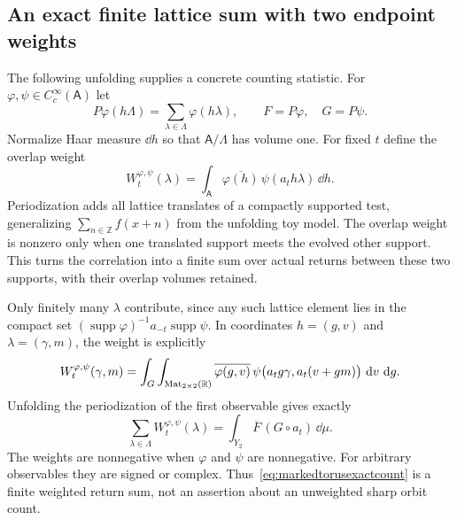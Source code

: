 \subsection{An exact finite lattice sum with two endpoint weights}

The following unfolding supplies a concrete counting statistic.
For $\varphi,\psi\in C_c^\infty(\mathsf A)$ let
\[
 P\varphi(h\Lambda)=\sum_{\lambda\in\Lambda}\varphi(h\lambda),
 \qquad F=P\varphi,\quad G=P\psi.
\]
Normalize Haar measure $\dd h$ so that $\mathsf A/\Lambda$ has volume one.
For fixed $t$ define the overlap weight
\begin{equation}
 W_t^{\varphi,\psi}(\lambda)
 =\int_{\mathsf A}\overline{\varphi(h)}\,
                   \psi(a_th\lambda)\,\dd h.
 \label{eq:markedtorusweight}
\end{equation}
Periodization adds all lattice translates of a compactly supported
test, generalizing $\sum_{n\in\mathbb Z}f(x+n)$ from the
unfolding toy model. The overlap weight is nonzero only when
one translated support meets the evolved other support.
This turns the correlation into a finite sum over actual returns
between these two supports, with their overlap volumes retained.

Only finitely many $\lambda$ contribute, since any such lattice
element lies in the compact set
$(\operatorname{supp}\varphi)^{-1}a_{-t}
\operatorname{supp}\psi$. In coordinates
$h=(g,v)$ and $\lambda=(\gamma,m)$, the weight is explicitly
\begin{equation}
 W_t^{\varphi,\psi}(\gamma,m)
 =\int_G\int_{\operatorname{Mat}_{2\times2}(\mathbb R)}
    \overline{\varphi(g,v)}\,
    \psi\bigl(a_tg\gamma,a_t(v+gm)\bigr)\,\mathop{}\!\mathrm d v\,\mathop{}\!\mathrm d g.
 \label{eq:markedtorusweightcoordinates}
\end{equation}
Unfolding the periodization of the first observable gives exactly
\begin{equation}
 \sum_{\lambda\in\Lambda}W_t^{\varphi,\psi}(\lambda)
   =\int_{Y_2}\overline F\,(G\circ a_t)\,\dd\mu.
 \label{eq:markedtorusexactcount}
\end{equation}
The weights are nonnegative when $\varphi$ and $\psi$ are
nonnegative. For arbitrary observables they are signed or complex.
Thus~\eqref{eq:markedtorusexactcount} is a finite weighted return
sum, not an assertion about an unweighted sharp orbit count.

